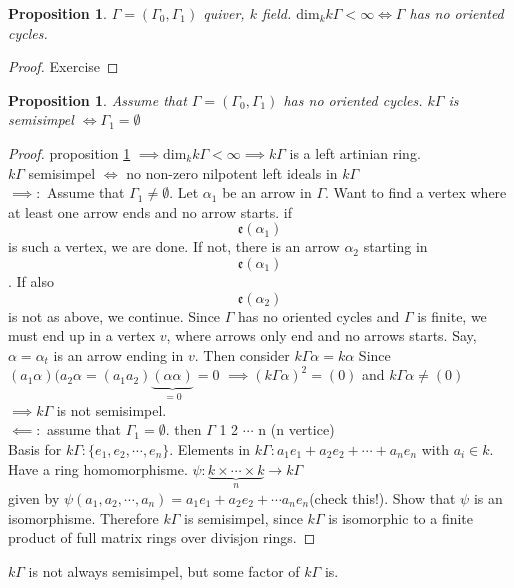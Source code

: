 \documentclass{amsart}
\numberwithin{equation}{section}
\newtheorem{prop}[thm]{Proposition}
\theoremstyle{definition}
\newcommand{\G}{\Gamma}
\begin{document}
\begin{prop}\label{prop1}
	$\G = (\G_0,\G_1)$ quiver, $k$ field. $\text{dim}_kk\G < \infty \iff \G$ has no oriented cycles.
\end{prop}

\begin{proof}
	Exercise
\end{proof}

\begin{prop}
	Assume that $\G=(\G_0,\G_1)$ has no oriented cycles. $k\G$ is semisimpel $\iff \G_1 = \emptyset$
\end{prop}

\begin{proof}
	proposition \ref{prop1} $ \implies \text{dim}_kk\G < \infty \implies k\G$ is a left artinian ring. \\
	$k\G$ semisimpel $\iff $ no non-zero nilpotent left ideals in $k\G$\\
	$\implies\colon$ Assume that $\G_1\neq\emptyset.$ Let $\alpha_1$ be an arrow in $\G$. Want to find a vertex where at least one arrow ends and no arrow starts. if \[\mathfrak{e}(\alpha_1)\] is such a vertex, we are done. If not, there is an arrow $\alpha_2$ starting in \[\mathfrak{e}(\alpha_1) \]. If also\[\mathfrak{e}(\alpha_2)\] is not as above, we continue. Since $\G$ has no oriented cycles and $\G$ is finite, we must end up in a vertex $ v$, where arrows only end and no arrows starts. Say, $\alpha = \alpha_t$ is an arrow ending in $v$. Then consider $k\G\alpha = k\alpha$ Since $(a_1\alpha)(a_2\alpha = (a_1a_2)\underbrace{(\alpha\alpha)}_{=0} = 0$ $\implies (k\G\alpha)^2=(0)$ and $k\G\alpha \neq (0)$\\
	$\implies k\G$ is not semisimpel.\\\newline
	$\impliedby\colon$ assume that $\G_1 = \emptyset$. then $\G$ 1 2 $\cdots$ n (n vertice)\\
	Basis for $k\G\colon \{e_1, e_2, \cdots, e_n\}$. Elements in $k\G\colon a_1e_1 + a_2e_2 + \cdots + a_ne_n$ with $a_i \in k$. Have a ring homomorphisme. $ \psi\colon \underbrace{k \times \cdots \times k}_{n}  \rightarrow k\G$\\
	given by $\psi(a_1,a_2,\cdots,a_n)=a_1e_1 + a_2e_2+ \cdots a_ne_n$(check this!). Show that $\psi$ is an isomorphisme. Therefore $k\G$ is semisimpel, since $k\G$ is isomorphic to a finite product of full matrix rings over divisjon rings.
\end{proof}

$k\G$ is not always semisimpel, but some factor of $k\G$ is.\newline
\end{document}
